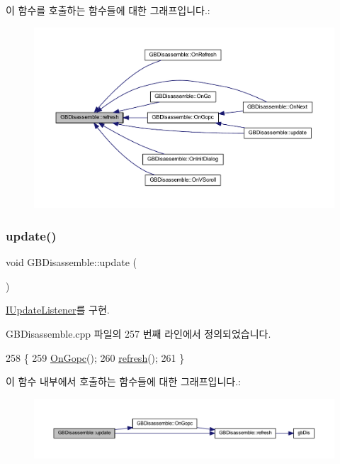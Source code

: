 이 함수를 호출하는 함수들에 대한 그래프입니다.\+:
\nopagebreak
\begin{figure}[H]
\begin{center}
\leavevmode
\includegraphics[width=350pt]{class_g_b_disassemble_a0ae217c08ead8a3cf62c59dadaa27fde_icgraph}
\end{center}
\end{figure}
\mbox{\label{class_g_b_disassemble_a1170fe51e14d0b770f5200bf4e193423}} 
\subsubsection{\texorpdfstring{update()}{update()}}
{\footnotesize\ttfamily void G\+B\+Disassemble\+::update (\begin{DoxyParamCaption}{ }\end{DoxyParamCaption})\hspace{0.3cm}{\ttfamily [virtual]}}



\mbox{\hyperlink{class_i_update_listener_ac03b85f52e858d0bbd08a4984b2cb929}{I\+Update\+Listener}}를 구현.



G\+B\+Disassemble.\+cpp 파일의 257 번째 라인에서 정의되었습니다.


\begin{DoxyCode}
258 \{
259   \mbox{\hyperlink{class_g_b_disassemble_abd524f55b59a178d22778d9e5b80905f}{OnGopc}}();
260   \mbox{\hyperlink{class_g_b_disassemble_a0ae217c08ead8a3cf62c59dadaa27fde}{refresh}}();
261 \}
\end{DoxyCode}
이 함수 내부에서 호출하는 함수들에 대한 그래프입니다.\+:
\nopagebreak
\begin{figure}[H]
\begin{center}
\leavevmode
\includegraphics[width=350pt]{class_g_b_disassemble_a1170fe51e14d0b770f5200bf4e193423_cgraph}
\end{center}
\end{figure}


